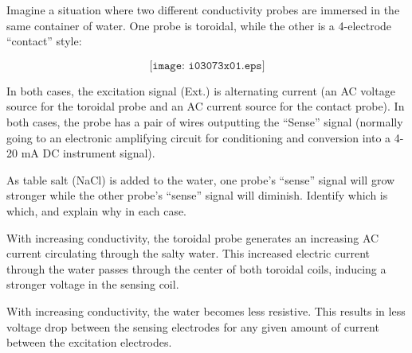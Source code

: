 

Imagine a situation where two different conductivity probes are immersed in the same container of water.  One probe is toroidal, while the other is a 4-electrode ``contact'' style: 

$$\texttt{[image: i03073x01.eps]}$$

In both cases, the excitation signal (Ext.) is alternating current (an AC voltage source for the toroidal probe and an AC current source for the contact probe).  In both cases, the probe has a pair of wires outputting the ``Sense'' signal (normally going to an electronic amplifying circuit for conditioning and conversion into a 4-20 mA DC instrument signal).

As table salt (NaCl) is added to the water, one probe's ``sense'' signal will grow stronger while the other probe's ``sense'' signal will diminish.  Identify which is which, and explain why in each case.







With increasing conductivity, the toroidal probe generates an increasing AC current circulating through the salty water.  This increased electric current through the water passes through the center of both toroidal coils, inducing a stronger voltage in the sensing coil.

\vskip 10pt

With increasing conductivity, the water becomes less resistive.  This results in less voltage drop between the sensing electrodes for any given amount of current between the excitation electrodes.











